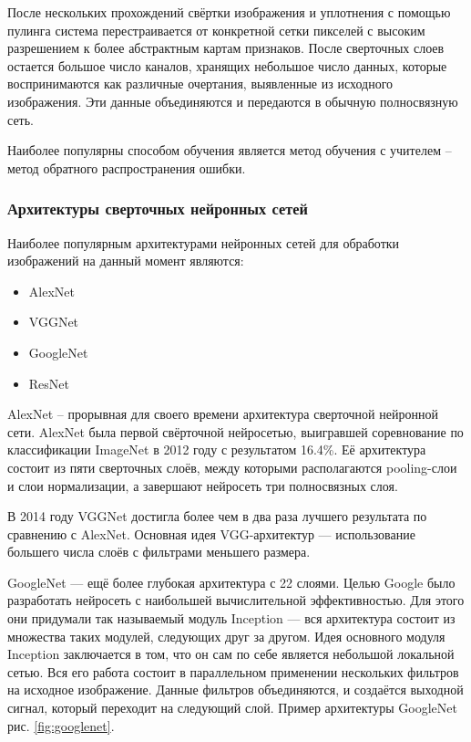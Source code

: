 \documentclass[a4paper,14pt]{article}
\begin{document}
	После нескольких прохождений свёртки изображения и уплотнения с помощью пулинга система перестраивается от конкретной сетки пикселей с высоким разрешением к более абстрактным картам признаков.
	После сверточных слоев остается большое число каналов, хранящих небольшое число данных, которые воспринимаются как различные очертания, выявленные из исходного изображения.
	Эти данные объединяются и передаются в обычную полносвязную сеть.
	
	Наиболее популярны способом обучения является метод обучения с учителем -- метод обратного распространения ошибки.
	
	\subsubsection{Архитектуры сверточных нейронных сетей}
	
	Наиболее популярным архитектурами нейронных сетей для обработки изображений на данный момент являются:
	\begin{itemize}
		\item AlexNet
		\item VGGNet
		\item GoogleNet
		\item ResNet
	\end{itemize}
	
	AlexNet -- прорывная для своего времени архитектура сверточной нейронной сети.
	AlexNet была первой свёрточной нейросетью, выигравшей соревнование по классификации ImageNet в 2012 году с результатом 16.4\%.
	Её архитектура состоит из пяти сверточных слоёв, между которыми располагаются pooling-слои и слои нормализации, а завершают нейросеть три полносвязных слоя.
	
	В 2014 году VGGNet достигла более чем в два раза лучшего результата по сравнению с AlexNet.
	Основная идея VGG-архитектур — использование большего числа слоёв с фильтрами меньшего размера.
	
	GoogleNet — ещё более глубокая архитектура с 22 слоями.
	Целью Google было разработать нейросеть с наибольшей вычислительной эффективностью.
	Для этого они придумали так называемый модуль Inception — вся архитектура состоит из множества таких модулей, следующих друг за другом.
	Идея основного модуля Inception заключается в том, что он сам по себе является небольшой локальной сетью.
	Вся его работа состоит в параллельном применении нескольких фильтров на исходное изображение.
	Данные фильтров объединяются, и создаётся выходной сигнал, который переходит на следующий слой.
	Пример архитектуры GoogleNet рис. \ref{fig:googlenet}.
	
\end{document}
